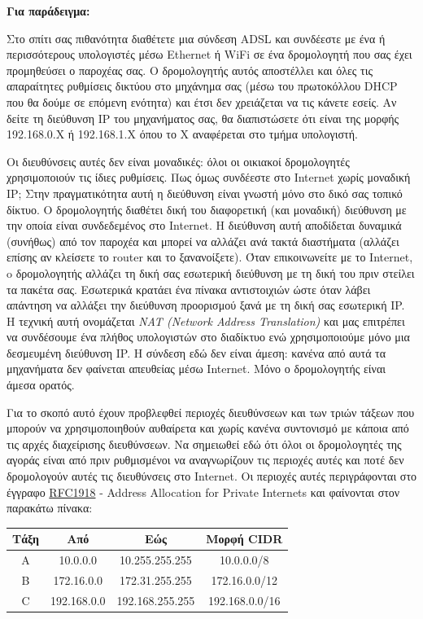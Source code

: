 \begin{inthebox}
\textbf{Για παράδειγμα:}

Στο σπίτι σας πιθανότητα διαθέτετε μια σύνδεση ADSL και συνδέεστε με ένα ή περισσότερους υπολογιστές μέσω Ethernet ή WiFi σε ένα δρομολογητή που σας έχει προμηθεύσει ο παροχέας σας. Ο δρομολογητής αυτός αποστέλλει και όλες τις απαραίτητες ρυθμίσεις δικτύου στο μηχάνημα σας (μέσω του πρωτοκόλλου DHCP που θα δούμε σε επόμενη ενότητα) και έτσι δεν χρειάζεται να τις κάνετε εσείς. Αν δείτε τη διεύθυνση IP του μηχανήματος σας, θα διαπιστώσετε ότι είναι της μορφής 192.168.0.X ή 192.168.1.X όπου το Χ αναφέρεται στο τμήμα υπολογιστή.

Οι διευθύνσεις αυτές δεν είναι μοναδικές: όλοι οι οικιακοί δρομολογητές χρησιμοποιούν τις ίδιες ρυθμίσεις. Πως όμως συνδέεστε στο Internet χωρίς μοναδική IP; Στην πραγματικότητα αυτή η διεύθυνση είναι γνωστή μόνο στο δικό σας τοπικό δίκτυο. Ο δρομολογητής διαθέτει δική του διαφορετική (και μοναδική) διεύθυνση με την οποία είναι συνδεδεμένος στο Internet. Η διεύθυνση αυτή αποδίδεται δυναμικά (συνήθως) από τον παροχέα και μπορεί να αλλάζει ανά τακτά διαστήματα (αλλάζει επίσης αν κλείσετε το router και το ξανανοίξετε). Όταν επικοινωνείτε με το Internet, o δρομολογητής αλλάζει τη δική σας εσωτερική διεύθυνση με τη δική του πριν στείλει τα πακέτα σας. Εσωτερικά κρατάει ένα πίνακα αντιστοιχιών ώστε όταν λάβει απάντηση να αλλάξει την διεύθυνση προορισμού ξανά με τη δική σας εσωτερική IP. Η τεχνική αυτή ονομάζεται \emph{NAT (Network Address Translation)} και μας επιτρέπει να συνδέσουμε ένα πλήθος υπολογιστών στο διαδίκτυο ενώ χρησιμοποιούμε μόνο μια δεσμευμένη διεύθυνση IP. Η σύνδεση εδώ δεν είναι άμεση: κανένα από αυτά τα μηχανήματα δεν φαίνεται απευθείας μέσω Internet. Μόνο ο δρομολογητής είναι άμεσα ορατός.\\
\end{inthebox}

Για το σκοπό αυτό έχουν προβλεφθεί περιοχές διευθύνσεων και των τριών τάξεων που μπορούν να χρησιμοποιηθούν αυθαίρετα και χωρίς κανένα συντονισμό με κάποια από τις αρχές διαχείρισης διευθύνσεων. Να σημειωθεί εδώ ότι όλοι οι δρομολογητές της αγοράς είναι από πριν ρυθμισμένοι να αναγνωρίζουν τις περιοχές αυτές και ποτέ δεν δρομολογούν αυτές τις διευθύνσεις στο Internet. Οι περιοχές αυτές περιγράφονται στο έγγραφο \href{https://www.ietf.org/rfc/rfc1918.txt}{RFC1918} - Address Allocation for Private Internets και φαίνονται στον παρακάτω πίνακα:

\begin{center}
\begin{tabular}{|c|c|c|c|}
\hline
\textbf{Τάξη} & \textbf{Από} & \textbf{Εώς} & \textbf{Μορφή CIDR} \\
\hline
A & 10.0.0.0 & 10.255.255.255 & 10.0.0.0/8\\
\hline
B & 172.16.0.0 & 172.31.255.255 & 172.16.0.0/12\\
\hline
C & 192.168.0.0 & 192.168.255.255 & 192.168.0.0/16\\
\hline
\end{tabular}
\end{center}

